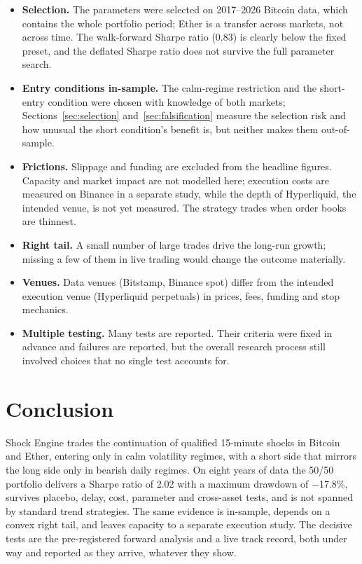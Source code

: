 \documentclass[11pt,a4paper]{article}
\newcommand{\1}{\mathbf{1}}
\begin{document}
\begin{itemize}
\item \textbf{Selection.} The parameters were selected on 2017--2026 Bitcoin data, which contains the whole portfolio period; Ether is a transfer across markets, not across time. The walk-forward Sharpe ratio (0.83) is clearly below the fixed preset, and the deflated Sharpe ratio does not survive the full parameter search.
\item \textbf{Entry conditions in-sample.} The calm-regime restriction and the short-entry condition were chosen with knowledge of both markets; Sections~\ref{sec:selection} and~\ref{sec:falsification} measure the selection risk and how unusual the short condition's benefit is, but neither makes them out-of-sample.
\item \textbf{Frictions.} Slippage and funding are excluded from the headline figures. Capacity and market impact are not modelled here; execution costs are measured on Binance in a separate study, while the depth of Hyperliquid, the intended venue, is not yet measured. The strategy trades when order books are thinnest.
\item \textbf{Right tail.} A small number of large trades drive the long-run growth; missing a few of them in live trading would change the outcome materially.
\item \textbf{Venues.} Data venues (Bitstamp, Binance spot) differ from the intended execution venue (Hyperliquid perpetuals) in prices, fees, funding and stop mechanics.
\item \textbf{Multiple testing.} Many tests are reported. Their criteria were fixed in advance and failures are reported, but the overall research process still involved choices that no single test accounts for.
\end{itemize}

\section{Conclusion}

Shock Engine trades the continuation of qualified 15-minute shocks in Bitcoin and Ether, entering only in calm volatility regimes, with a short side that mirrors the long side only in bearish daily regimes. On eight years of data the 50/50 portfolio delivers a Sharpe ratio of 2.02 with a maximum drawdown of \ensuremath{-}17.8\%, survives placebo, delay, cost, parameter and cross-asset tests, and is not spanned by standard trend strategies. The same evidence is in-sample, depends on a convex right tail, and leaves capacity to a separate execution study. The decisive tests are the pre-registered forward analysis and a live track record, both under way and reported as they arrive, whatever they show.
\end{document}
